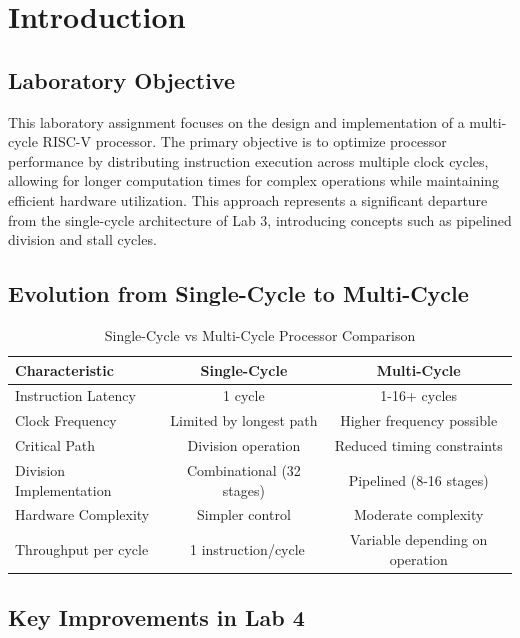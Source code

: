 \documentclass[a4paper, 11pt]{article}
\begin{document}

\section{Introduction}

\subsection{Laboratory Objective}
This laboratory assignment focuses on the design and implementation of a multi-cycle RISC-V processor. The primary objective is to optimize processor performance by distributing instruction execution across multiple clock cycles, allowing for longer computation times for complex operations while maintaining efficient hardware utilization. This approach represents a significant departure from the single-cycle architecture of Lab 3, introducing concepts such as pipelined division and stall cycles.

\subsection{Evolution from Single-Cycle to Multi-Cycle}

\begin{table}[H]
\centering
\caption{Single-Cycle vs Multi-Cycle Processor Comparison}
\begin{tabular}{|l|c|c|}
\hline
\textbf{Characteristic} & \textbf{Single-Cycle} & \textbf{Multi-Cycle} \\
\hline
Instruction Latency & 1 cycle & 1-16+ cycles \\
\hline
Clock Frequency & Limited by longest path & Higher frequency possible \\
\hline
Critical Path & Division operation & Reduced timing constraints \\
\hline
Division Implementation & Combinational (32 stages) & Pipelined (8-16 stages) \\
\hline
Hardware Complexity & Simpler control & Moderate complexity \\
\hline
Throughput per cycle & ~1 instruction/cycle & Variable depending on operation \\
\hline
\end{tabular}
\end{table}

\subsection{Key Improvements in Lab 4}
\end{document}
